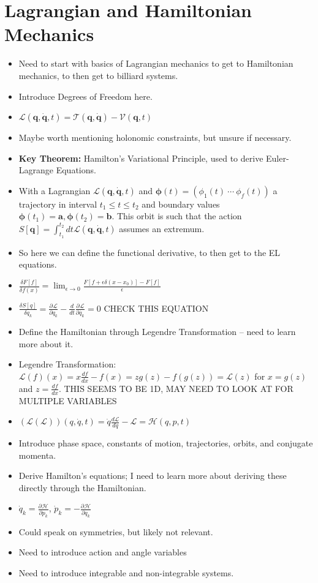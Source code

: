 \documentclass[12pt,a4paper]{amsart}
\newcommand{\legendre}[1]{\mathscr{L}(#1)}
\newcommand{\pderiv}[3][]{%
  \frac{\partial^{#1} #2}{\partial #3^{#1}}%
}
\begin{document}
\section*{Lagrangian and Hamiltonian Mechanics}
\begin{itemize}
    \item Need to start with basics of Lagrangian mechanics to get to Hamiltonian mechanics, to then get to billiard systems.
    \item Introduce Degrees of Freedom here.
    \item $\mathcal{L}(\bm{q}, \bm{\dot{q}}, t) = \mathcal{T}(\bm{q}, \bm{\dot{q}}) - \mathcal{V}(\bm{q}, t)$
    \item Maybe worth mentioning holonomic constraints, but unsure if necessary.
    \item \textbf{Key Theorem:} Hamilton's Variational Principle, used to derive Euler-Lagrange Equations.
    \item With a Lagrangian $\mathcal{L}(\bm{q}, \bm{\dot{q}}, t)$ and $\bm{\phi}(t) = (\phi_{1}(t)\ \cdots \ \phi_{f}(t))$ a trajectory in interval $t_1 \leq t \leq t_2$ and boundary values $\bm{\phi}(t_{1}) = \bm{a}, \bm{\phi}(t_{2}) = \bm{b}$. This orbit is such that the action $S[\bm{q}] = \int_{t_{1}}^{t_{2}} dt \mathcal{L}(\bm{q}, \bm{\dot{q}}, t)$ assumes an extremum.
    \item So here we can define the functional derivative, to then get to the EL equations.
    \item $\frac{\delta F[f]}{\delta f(x)} = \lim_{\epsilon \to 0} \frac{F[f + \epsilon \delta(x - x_0)] - F[f]}{\epsilon}$
    \item $\frac{\delta S[q]}{\delta q_{k}} = \pderiv{\mathcal{L}}{q_{k}} - \frac{d}{dt} \pderiv{\mathcal{L}}{\dot{q_{k}}} = 0$ CHECK THIS EQUATION
    \item Define the Hamiltonian through Legendre Transformation – need to learn more about it.
    \item Legendre Transformation: $\legendre{f}(x) = x \frac{df}{dx} - f(x) = zg(z) - f(g(z)) = \legendre{z}$ for $x = g(z)$ and $z = \frac{df}{dx}.$ THIS SEEMS TO BE 1D, MAY NEED TO LOOK AT FOR MULTIPLE VARIABLES
    \item $(\legendre{\mathcal{L}})(q, \dot{q}, t) = \dot{q}\frac{d\mathcal{L}}{d\dot{q}} - \mathcal{L} = \mathcal{H}(q, p, t)$
    \item Introduce phase space, constants of motion, trajectories, orbits, and conjugate momenta.
    \item Derive Hamilton's equations; I need to learn more about deriving these directly through the Hamiltonian.
    \item $\dot{q}_{k} = \pderiv{\mathcal{H}}{p_k}$, $\dot{p}_{k} = -\pderiv{\mathcal{H}}{q_k}$
    \item Could speak on symmetries, but likely not relevant.
    \item Need to introduce action and angle variables
    \item Need to introduce integrable and non-integrable systems.
\end{itemize}
\end{document}
